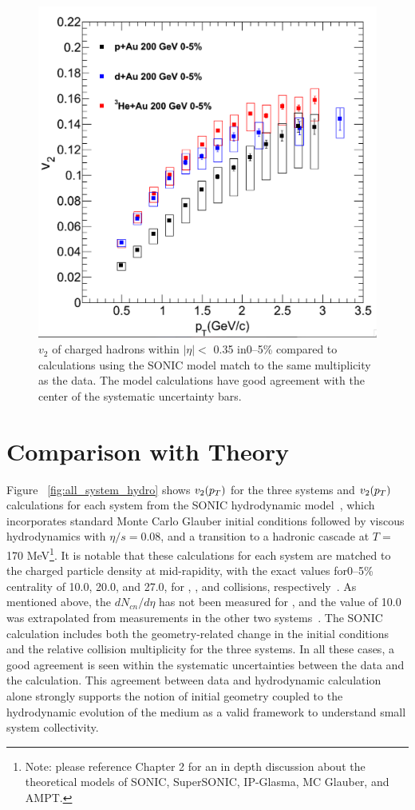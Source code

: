 \begin{figure}[!ht]
\begin{center}
\includegraphics[width=0.65\linewidth]{figs/v2_3_sys_compare_nohydro.png}
\caption{$v_2$ of charged hadrons within $|\eta| <$ 0.35 in0--5\% \pau compared to calculations using the SONIC model match to the same multiplicity as the data. The model calculations have good agreement with the center of the systematic uncertainty bars.}
\label{fig:v2_3_sys_compare_nohydro}
\end{center}
\end{figure}

\section{Comparison with Theory}
Figure ~\ref{fig:all_system_hydro} shows $v_2(\mbox{$p_T$})$ for the three systems and $v_2(\mbox{$p_T$})$ calculations for each system from the SONIC hydrodynamic model~\cite{Habich:2014jna}, which incorporates standard Monte Carlo Glauber initial conditions followed by viscous hydrodynamics with $\eta/s=0.08$, and a transition to a hadronic cascade at $T=$ 170 MeV\footnote{Note: please reference Chapter 2 for an in depth discussion about the theoretical models of SONIC, SuperSONIC, IP-Glasma, MC Glauber, and AMPT.}. It is notable that these calculations for each system are matched to the charged particle density at mid-rapidity, with the exact values for0--5\% centrality of 10.0, 20.0, and 27.0, for \pau, \dau, and \hau collisions, respectively~\cite{Habich:2014jna}. As mentioned above, the $dN_{cn}/d\eta$ has not been measured for \pau, and the value of 10.0 was extrapolated from measurements in the other two systems~\cite{Habich:2014jna}. The SONIC calculation includes both the geometry-related change in the initial conditions and the relative collision multiplicity for the three systems. In all these cases, a good agreement is seen within the systematic uncertainties between the data and the calculation. This agreement between data and hydrodynamic calculation alone strongly supports the notion of initial geometry coupled to the hydrodynamic evolution of the medium as a valid framework to understand small system collectivity.

